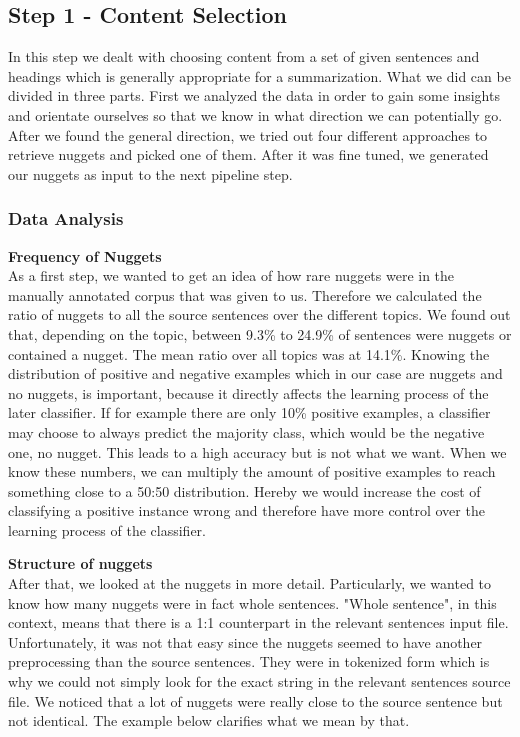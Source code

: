 
\subsection{Step 1 - Content Selection}
In this step we dealt with choosing content from a set of given sentences and headings which is generally appropriate for a summarization. What we did can be divided in three parts. First we analyzed the data in order to gain some insights and orientate ourselves so that we know in what direction we can potentially go. After we found the general direction, we tried out four different approaches to retrieve nuggets and picked one of them. After it was fine tuned, we generated our nuggets as input to the next pipeline step.
\subsubsection{Data Analysis}
\textbf{Frequency of Nuggets} \\
As a first step, we wanted to get an idea of how rare nuggets were in the manually annotated corpus that was given to us. Therefore we calculated the ratio of nuggets to all the source sentences over the different topics. We found out that, depending on the topic, between 9.3\% to 24.9\% of sentences were nuggets or contained a nugget. The mean ratio over all topics was at 14.1\%. Knowing the distribution of positive and negative examples which in our case are nuggets and no nuggets, is important, because it directly affects the learning process of the later classifier. If for example there are only 10\% positive examples, a classifier may choose to always predict the majority class, which would be the negative one, no nugget. This leads to a high accuracy but is not what we want. When we know these numbers, we can multiply the amount of positive examples to reach something close to a 50:50 distribution. Hereby we would increase the cost of classifying a positive instance wrong and therefore have more control over the learning process of the classifier. \newline

\textbf{Structure of nuggets}\\
After that, we looked at the nuggets in more detail. Particularly, we wanted to know how many nuggets were in fact whole sentences. "Whole sentence", in this context, means that there is a 1:1 counterpart in the relevant sentences input file. Unfortunately, it was not that easy since the nuggets seemed to have another preprocessing than the source sentences. They were in tokenized form which is why we could not simply look for the exact string in the relevant sentences source file. We noticed that a lot of nuggets were really close to the source sentence but not identical. The example below clarifies what we mean by that.

